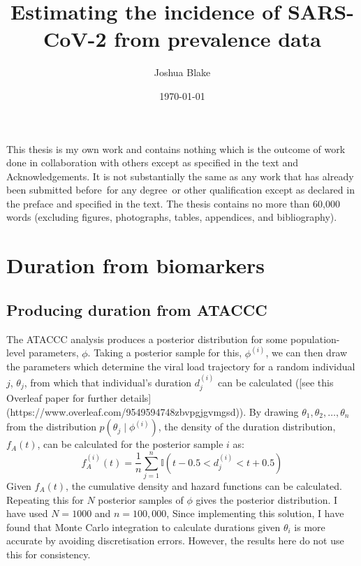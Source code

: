 \documentclass[a4paper,12pt,custombib,times]{PhDThesisPSnPDF} %
\title{Estimating the incidence of SARS-CoV-2 from prevalence data}
\author{Joshua Blake}
\date{\today}
\begin{document}
\frontmatter

\maketitle

\begin{declaration}
    This thesis is my own work and contains nothing which is the outcome of work done in collaboration with others except as specified in the text and Acknowledgements.
    It is not substantially the same as any work that has already been submitted before for any degree or other qualification except as declared in the preface and specified in the text.
    The thesis contains no more than 60,000 words (excluding figures, photographs, tables, appendices, and bibliography).
\end{declaration}

\begin{acknowledgements}      
\end{acknowledgements}

\tableofcontents

\listoffigures

\mainmatter

\chapter{Duration from biomarkers} \label{ATACCC}

\section{Producing duration from ATACCC}

The ATACCC analysis produces a posterior distribution for some population-level parameters, $\phi$.
Taking a posterior sample for this, $\phi^{(i)}$, we can then draw the parameters which determine the viral
load trajectory for a random individual $j$, $\theta_j$, from which that individual's duration $d_j^{(i)}$ can be calculated ([see this Overleaf paper for further details](https://www.overleaf.com/9549594748zbvpgjgvmgsd)).
By drawing $\theta_1, \theta_2, \dots, \theta_n$ from the distribution $p(\theta_j \mid\phi^{(i)})$, the density of the duration distribution, $f_A(t)$, can be
calculated for the posterior sample $i$ as:
$$
f^{(i)}_A(t) = \frac{1}{n}\sum_{j=1}^n \mathbb{I} \left( t-0.5 < d_j^{(i)} < t+0.5 \right)
$$
Given $f_A(t)$, the cumulative density and hazard functions can be calculated.
Repeating this for $N$ posterior samples of $\phi$ gives the posterior distribution.
I have used $N = 1000$ and $n = 100,000$, 
Since implementing this solution, I have found that Monte Carlo integration to calculate durations given $\theta_i$ is more accurate by avoiding discretisation errors.
However, the results here do not use this for consistency.
\end{document}
